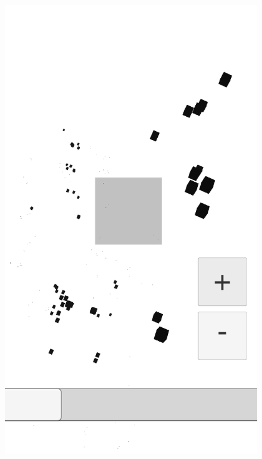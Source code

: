 \begin{figure}[H]
\centering
    \hspace{-4mm}
    \begin{minipage}{0.5\textwidth}
        \centering
        \includegraphics[scale=0.2]{Images/Shaders/profundidad (4).png}\\
    \end{minipage}
    \begin{minipage}{0.5\textwidth}
        \centering

\end{minipage}
\end{figure}
